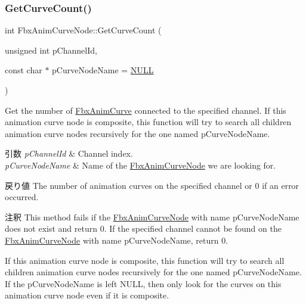 \subsubsection{\texorpdfstring{Get\+Curve\+Count()}{GetCurveCount()}}
{\footnotesize\ttfamily int Fbx\+Anim\+Curve\+Node\+::\+Get\+Curve\+Count (\begin{DoxyParamCaption}\item[{unsigned int}]{p\+Channel\+Id,  }\item[{const char $\ast$}]{p\+Curve\+Node\+Name = {\ttfamily \hyperlink{fbxarch_8h_a070d2ce7b6bb7e5c05602aa8c308d0c4}{N\+U\+LL}} }\end{DoxyParamCaption})}

Get the number of \hyperlink{class_fbx_anim_curve}{Fbx\+Anim\+Curve} connected to the specified channel. If this animation curve node is composite, this function will try to search all children animation curve nodes recursively for the one named p\+Curve\+Node\+Name. 
\begin{DoxyParams}{引数}
{\em p\+Channel\+Id} & Channel index. \\
\hline
{\em p\+Curve\+Node\+Name} & Name of the \hyperlink{class_fbx_anim_curve_node}{Fbx\+Anim\+Curve\+Node} we are looking for. \\
\hline
\end{DoxyParams}
\begin{DoxyReturn}{戻り値}
The number of animation curves on the specified channel or 0 if an error occurred. 
\end{DoxyReturn}
\begin{DoxyRemark}{注釈}
This method fails if the \hyperlink{class_fbx_anim_curve_node}{Fbx\+Anim\+Curve\+Node} with name p\+Curve\+Node\+Name does not exist and return 0. If the specified channel cannot be found on the \hyperlink{class_fbx_anim_curve_node}{Fbx\+Anim\+Curve\+Node} with name p\+Curve\+Node\+Name, return 0. 

If this animation curve node is composite, this function will try to search all children animation curve nodes recursively for the one named p\+Curve\+Node\+Name. If the p\+Curve\+Node\+Name is left N\+U\+LL, then only look for the curves on this animation curve node even if it is composite. 
\end{DoxyRemark}
\mbox{\label{class_fbx_anim_curve_node_a482d23e7517db05af3252b2c02ce2415}} 
